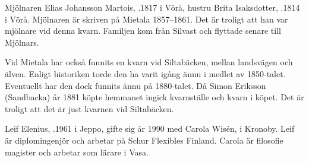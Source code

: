 Mjölnaren Elias Johansson Martois, .1817 i Vörå, hustru Brita Isaksdotter, .1814 i Vörå. Mjölnaren är skriven på Mietala 1857–1861. Det är troligt att han var mjölnare vid denna kvarn. Familjen kom från Silvast och flyttade senare till Mjölnars.
\begin{jhchildren}
  \item {}
  \item {}
  \item {}
  \item {}
  \item {}
  \item {}
  \item {}
  \item {}
\end{jhchildren}



Vid Mietala har också funnits en kvarn vid Siltabäcken, mellan landsvägen och älven. Enligt historiken torde den ha varit igång ännu i medlet av 1850-talet. Eventuellt har den dock funnits ännu på 1880-talet. Då Simon Eriksson (Sandbacka) år 1881 köpte hemmanet ingick kvarnställe och kvarn  i köpet. Det är troligt att det är just kvarnen vid Siltabäcken.






Leif Elenius, .1961 i Jeppo, gifte sig år 1990 med Carola Wisén,  i Kronoby. Leif är diplomingenjör och arbetar på Schur Flexibles Finland. Carola är filosofie magister och arbetar som lärare i Vasa.

\begin{jhchildren}
  \item {}
  \item {}
  \item {}
\end{jhchildren}

